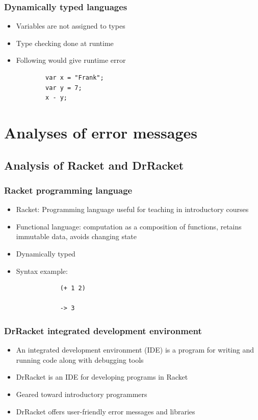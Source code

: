 \documentclass{beamer}
\begin{document}
\begin{frame}[fragile]
  \frametitle{Dynamically typed languages}
	\begin{itemize}
		\item Variables are not assigned to types
		\item Type checking done at runtime
		\item Following would give runtime error
		\begin{verbatim}
		var x = "Frank";
		var y = 7;
		x - y;
		\end{verbatim}
	\end{itemize}
\end{frame}

\section[Analyses]{Analyses of error messages}

\subsection[DrRacket Analysis]{Analysis of Racket and DrRacket}

\begin{frame}[fragile]
	\frametitle{Racket programming language}
		\begin{itemize}
			\item Racket: Programming language useful for teaching in introductory courses
			\item Functional language: computation as a composition of functions, retains immutable data, avoids changing state
			\item Dynamically typed
			\item Syntax example:
			\begin{verbatim}
			(+ 1 2)

			-> 3
			\end{verbatim}
		\end{itemize}

\end{frame}

\begin{frame}
	\frametitle{DrRacket integrated development environment}
		\begin{itemize}
			\item An integrated development environment (IDE) is a program for writing and running code along with debugging tools
			\item DrRacket is an IDE for developing programs in Racket
			\item Geared toward introductory programmers
			\item DrRacket offers user-friendly error messages and libraries
		\end{itemize}
		
\end{frame}
\end{document}
